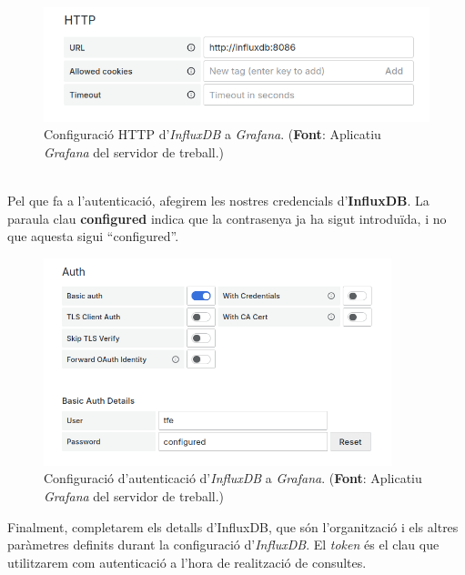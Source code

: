 \begin{figure}[htbp]
    \centerline{\includegraphics[width=\textwidth]{figures/grafana-influxdb-http}}
    \captionsetup{justification=centering}
    \caption[Configuració \gls{HTTP} d'\textit{InfluxDB} a \textit{Grafana}.]{Configuració \gls{HTTP} d'\textit{InfluxDB} a \textit{Grafana}. (\textbf{Font}: Aplicatiu \textit{Grafana} del servidor de treball.)}\label{fig:grafana-influxdb-http}
\end{figure}

\noindent \\
Pel que fa a l’autenticació, afegirem les nostres credencials d’\textbf{InfluxDB}.
La paraula clau \textbf{configured} indica que la contrasenya ja ha sigut introduïda, i no que aquesta sigui ``configured''.

\begin{figure}[htbp]
    \centerline{\includegraphics[width=0.9\textwidth]{figures/grafana-influxdb-auth}}
    \captionsetup{justification=centering}
    \caption[Configuració d'autenticació d'\textit{InfluxDB} a \textit{Grafana}.]{Configuració d'autenticació d'\textit{InfluxDB} a \textit{Grafana}. (\textbf{Font}: Aplicatiu \textit{Grafana} del servidor de treball.)}\label{fig:grafana-influxdb-auth}
\end{figure}

\clearpage
\noindent
Finalment, completarem els detalls d’InfluxDB, que són l’organització i els altres paràmetres definits durant la configuració d’\textit{InfluxDB}.
El \textit{token} és el clau que utilitzarem com autenticació a l’hora de realització de consultes.

